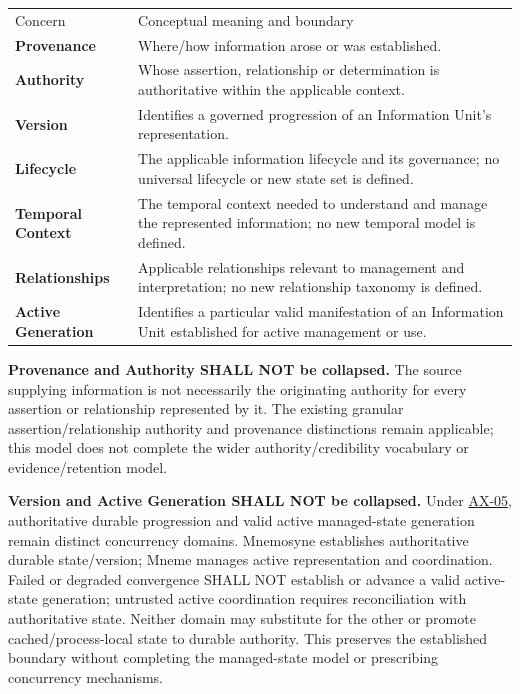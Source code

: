 \begin{longtable}{>{\raggedright\arraybackslash}p{}>{\raggedright\arraybackslash}p{}}
Concern & Conceptual meaning and boundary \\
\textbf{Provenance} & Where/how information arose or was established. \\
\textbf{Authority} & Whose assertion, relationship or determination is authoritative within the applicable context. \\
\textbf{Version} & Identifies a governed progression of an Information Unit's representation. \\
\textbf{Lifecycle} & The applicable information lifecycle and its governance; no universal lifecycle or new state set is defined. \\
\textbf{Temporal Context} & The temporal context needed to understand and manage the represented information; no new temporal model is defined. \\
\textbf{Relationships} & Applicable relationships relevant to management and interpretation; no new relationship taxonomy is defined. \\
\textbf{Active Generation} & Identifies a particular valid manifestation of an Information Unit established for active management or use. \\
\end{longtable}


\textbf{Provenance and Authority SHALL NOT be collapsed.} The source supplying
information is not necessarily the originating authority for every assertion or
relationship represented by it. The existing granular assertion/relationship
authority and provenance distinctions remain applicable; this model does not
complete the wider authority/credibility vocabulary or evidence/retention model.



\textbf{Version and Active Generation SHALL NOT be collapsed.} Under
\hyperref[element:0412a2084f0145babc4f022c71fea65f]{AX-05}, authoritative durable
progression and valid active managed-state generation remain distinct concurrency
domains. Mnemosyne establishes authoritative durable state/version; Mneme manages
active representation and coordination. Failed or degraded convergence SHALL NOT
establish or advance a valid active-state generation; untrusted active
coordination requires reconciliation with authoritative state. Neither domain
may substitute for the other or promote cached/process-local state to durable
authority. This preserves the established boundary without completing the
managed-state model or prescribing concurrency mechanisms.



